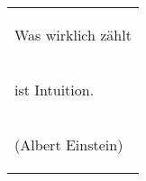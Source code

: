 \begin{table}[H]
  \centering
  \begin{tabular}{P{14cm}}
    \begin{LARGE}
		  \glqq Was wirklich zählt 
    \end{LARGE}\\
    \begin{LARGE}
		   ist Intuition.\grqq
    \end{LARGE}\\
    \begin{large}
      (Albert Einstein)
    \end{large}
  \end{tabular}
\end{table}